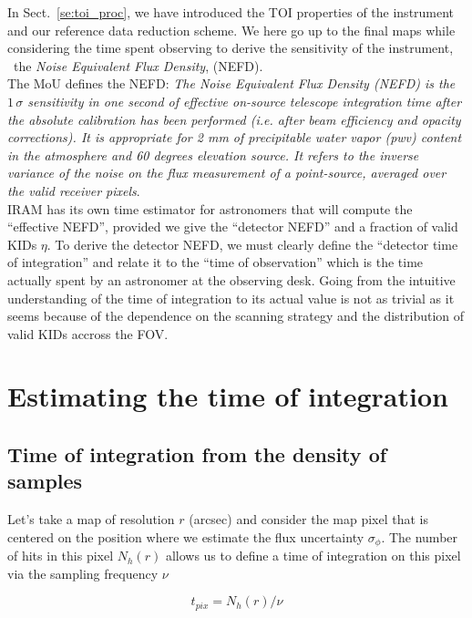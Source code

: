 
In Sect.~\ref{se:toi_proc}, we have introduced the TOI properties of the
instrument and our reference data reduction scheme. We here go up to the final
maps while considering the time spent observing to derive the sensitivity of the
instrument, \aka\ the \emph{Noise Equivalent Flux Density}, (NEFD).\\

The MoU defines the NEFD:  \emph{The Noise Equivalent Flux Density (NEFD)
  is the $1\,\sigma$ sensitivity in one second of effective on-source telescope
  integration time after the absolute calibration has been performed (i.e. after
  beam efficiency and opacity corrections). It is appropriate for 2 mm of
  precipitable water vapor (pwv) content in the atmosphere and 60 degrees
  elevation source. It refers to the inverse variance of the noise on the flux
  measurement of a point-source, averaged over the valid receiver pixels}.\\

IRAM has its own time estimator for astronomers that will compute the ``effective NEFD'',
provided we give the ``detector NEFD'' and a fraction of valid KIDs $\eta$. To
derive the detector NEFD, we must clearly define the ``detector time of
integration'' and relate it to the ``time of observation'' which is the time
actually spent by an astronomer at the observing desk. Going from the intuitive
understanding of the time of integration to its actual value is not as trivial
as it seems because of the dependence on the scanning strategy and the
distribution of valid KIDs accross the FOV.

\section{Estimating the time of integration}

\subsection{Time of integration from the density of samples}

Let's take a map of resolution $r$ (arcsec) and consider the map pixel that is
centered on the position where we estimate the flux uncertainty
$\sigma_\phi$. The number of hits in this pixel $N_h(r)$ allows us to define a
time of integration on this pixel via the sampling frequency $\nu$

\begin{equation}
t_{pix} = N_h(r)/\nu
\end{equation}


